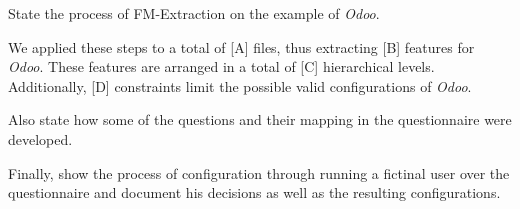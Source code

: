 State the process of FM-Extraction on the example of \textit{Odoo}.

We applied these steps to a total of [A] files, thus extracting [B] features for \textit{Odoo}. These features are arranged in a total of [C] hierarchical levels. Additionally, [D] constraints limit the possible valid configurations of \textit{Odoo}.

Also state how some of the questions and their mapping in the questionnaire were developed.

Finally, show the process of configuration through running a fictinal user over the questionnaire and document his decisions as well as the resulting configurations.


%


